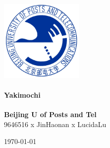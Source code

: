 \documentclass[12pt,a4paper]{article}
\begin{document}
\begin{titlepage}
\begin{center}
\vspace*{0.5cm}
\includegraphics[width=0.3\textwidth]{logo.jpg} \\ [2cm]

\HRule \\ [1cm]
\textbf{\Huge{Yakimochi}} \\ [0.5cm]
\HRule \\ [4cm]

\textbf{\Huge{Beijing U of Posts and Tel}} \\ [1cm]
\LARGE{9646516 x JinHaonan x LucidaLu}

\vfill
\Large{\today}
\end{center}
\clearpage

\tableofcontents
\pagestyle{empty}
\clearpage
\end{titlepage}



\end{document}

